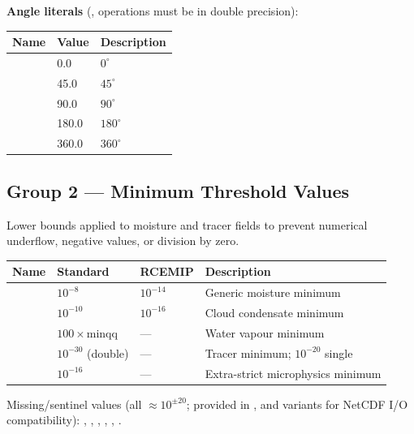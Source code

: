 \textbf{Angle literals} (, operations must be in double precision):

\begin{longtable}{L{3cm} L{3.5cm} L{7cm}}
  \toprule
  \textbf{Name} & \textbf{Value} & \textbf{Description} \\
  \midrule
  \endhead
  \bottomrule
  \endfoot
    & 0.0   & $0^\circ$ \\
    & 45.0  & $45^\circ$ \\
    & 90.0  & $90^\circ$ \\
   & 180.0 & $180^\circ$ \\
   & 360.0 & $360^\circ$ \\
\end{longtable}

\subsection{Group 2 --- Minimum Threshold Values}

Lower bounds applied to moisture and tracer fields to prevent numerical
underflow, negative values, or division by zero.

\begin{longtable}{L{2.5cm} L{3.5cm} L{3.5cm} L{4.5cm}}
  \toprule
  \textbf{Name} & \textbf{Standard} & \textbf{RCEMIP} & \textbf{Description} \\
  \midrule
  \endhead
  \bottomrule
  \endfoot
   & $10^{-8}$  & $10^{-14}$ & Generic moisture minimum \\
   & $10^{-10}$ & $10^{-16}$ & Cloud condensate minimum \\
   & $100\times\text{minqq}$ & --- & Water vapour minimum \\
   & $10^{-30}$ (double) & --- & Tracer minimum; $10^{-20}$ single \\
   & $10^{-16}$ & --- & Extra-strict microphysics minimum \\
\end{longtable}

Missing/sentinel values (all $\approx 10^{\pm20}$; provided in ,
 and  variants for NetCDF I/O compatibility):
, , , ,
, .

